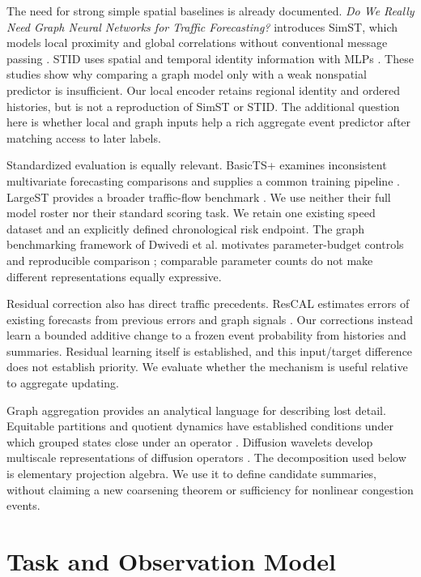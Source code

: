 \documentclass{llncs}
\begin{document}
The need for strong simple spatial baselines is already documented. \emph{Do We Really Need Graph Neural Networks for Traffic Forecasting?} introduces SimST, which models local proximity and global correlations without conventional message passing \cite{simst}. STID uses spatial and temporal identity information with MLPs \cite{stid}. These studies show why comparing a graph model only with a weak nonspatial predictor is insufficient. Our local encoder retains regional identity and ordered histories, but is not a reproduction of SimST or STID. The additional question here is whether local and graph inputs help a rich aggregate event predictor after matching access to later labels.

Standardized evaluation is equally relevant. BasicTS+ examines inconsistent multivariate forecasting comparisons and supplies a common training pipeline \cite{basicts}. LargeST provides a broader traffic-flow benchmark \cite{largest}. We use neither their full model roster nor their standard scoring task. We retain one existing speed dataset and an explicitly defined chronological risk endpoint. The graph benchmarking framework of Dwivedi et al. motivates parameter-budget controls and reproducible comparison \cite{benchmark}; comparable parameter counts do not make different representations equally expressive.

Residual correction also has direct traffic precedents. ResCAL estimates errors of existing forecasts from previous errors and graph signals \cite{rescal}. Our corrections instead learn a bounded additive change to a frozen event probability from histories and summaries. Residual learning itself is established, and this input/target difference does not establish priority. We evaluate whether the mechanism is useful relative to aggregate updating.

Graph aggregation provides an analytical language for describing lost detail. Equitable partitions and quotient dynamics have established conditions under which grouped states close under an operator \cite{schaub}. Diffusion wavelets develop multiscale representations of diffusion operators \cite{diffusion}. The decomposition used below is elementary projection algebra. We use it to define candidate summaries, without claiming a new coarsening theorem or sufficiency for nonlinear congestion events.







\section{Task and Observation Model}
\end{document}
